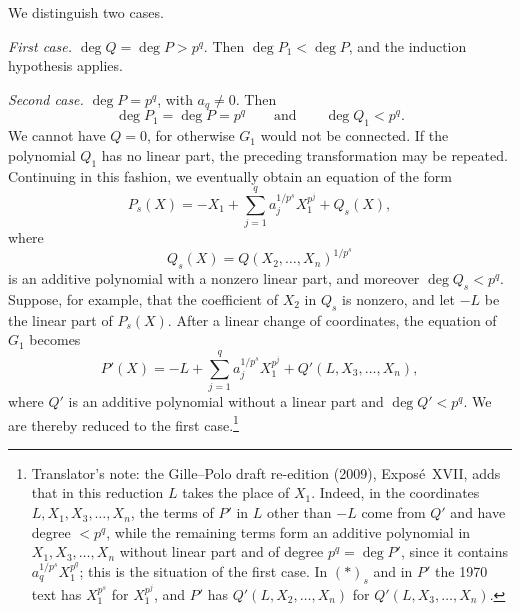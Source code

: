
We distinguish two cases.

\medskip\noindent\textit{First case.}\quad
\(\deg Q=\deg P>p^q\).  Then \(\deg P_1<\deg P\), and the
induction hypothesis applies.

\medskip\noindent\textit{Second case.}\quad
\(\deg P=p^q\), with \(a_q\ne0\).  Then
\[
  \deg P_1=\deg P=p^q
  \qquad\text{and}\qquad
  \deg Q_1<p^q.
\]
We cannot have \(Q=0\), for otherwise \(G_1\) would not be
connected.  If the polynomial \(Q_1\) has no linear part, the
preceding transformation may be repeated.  Continuing in this
fashion, we eventually obtain an equation of the form
\[
  \tag{\(*\)\(_s\)}\label{sga3:xvii:lemma:4-1-5:equation:star-s}
  P_s(X)=-X_1+\sum_{j=1}^{q}a_j^{1/p^s}X_1^{p^j}+Q_s(X),
\]
where
\[
  Q_s(X)=Q(X_2,\ldots,X_n)^{1/p^s}
\]
is an additive polynomial with a nonzero linear part, and moreover
\(\deg Q_s<p^q\).  Suppose, for example, that the coefficient of
\(X_2\) in \(Q_s\) is nonzero, and let \(-L\) be the linear part
of \(P_s(X)\).  After a linear change of coordinates, the equation
of \(G_1\) becomes
\[
  P'(X)=-L+\sum_{j=1}^{q}a_j^{1/p^s}X_1^{p^j}
    +Q'(L,X_3,\ldots,X_n),
\]
where \(Q'\) is an additive polynomial without a linear part and
\(\deg Q'<p^q\).  We are thereby reduced to the first
case.\footnote{Translator's note: the Gille--Polo draft re-edition
(2009), Exposé~XVII, adds that in this reduction \(L\) takes the
place of \(X_1\). Indeed, in the coordinates
\(L,X_1,X_3,\ldots,X_n\), the terms of \(P'\) in \(L\) other than
\(-L\) come from \(Q'\) and have degree \(<p^q\), while the remaining
terms form an additive polynomial in \(X_1,X_3,\ldots,X_n\) without
linear part and of degree \(p^q=\deg P'\), since it contains
\(a_q^{1/p^s}X_1^{p^q}\); this is the situation of the first case.
In \((*)_s\) and in \(P'\) the 1970 text has \(X_1^{p^s}\) for
\(X_1^{p^j}\), and \(P'\) has \(Q'(L,X_2,\ldots,X_n)\) for
\(Q'(L,X_3,\ldots,X_n)\).}

